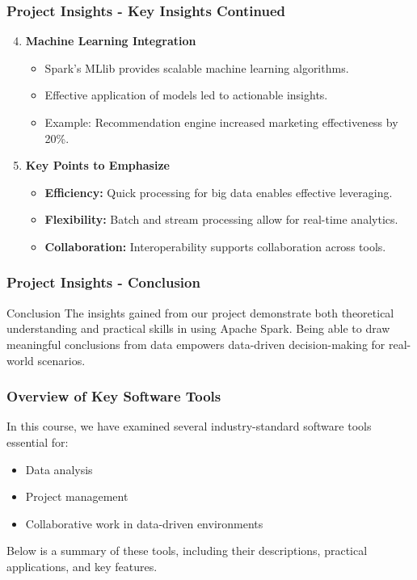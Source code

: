 \documentclass[aspectratio=169]{beamer}
\begin{document}
\begin{frame}[fragile]
    \frametitle{Project Insights - Key Insights Continued}
    \begin{enumerate}
        \setcounter{enumi}{3} %
        \item \textbf{Machine Learning Integration}
        \begin{itemize}
            \item Spark's MLlib provides scalable machine learning algorithms.
            \item Effective application of models led to actionable insights.
            \item Example: Recommendation engine increased marketing effectiveness by 20\%.
        \end{itemize}
        
        \item \textbf{Key Points to Emphasize}
        \begin{itemize}
            \item \textbf{Efficiency:} Quick processing for big data enables effective leveraging.
            \item \textbf{Flexibility:} Batch and stream processing allow for real-time analytics.
            \item \textbf{Collaboration:} Interoperability supports collaboration across tools.
        \end{itemize}
    \end{enumerate}
\end{frame}

\begin{frame}[fragile]
    \frametitle{Project Insights - Conclusion}
    \begin{block}{Conclusion}
        The insights gained from our project demonstrate both theoretical understanding and practical skills in using Apache Spark. 
        Being able to draw meaningful conclusions from data empowers data-driven decision-making for real-world scenarios.
    \end{block}
\end{frame}

\begin{frame}[fragile]
    \frametitle{Overview of Key Software Tools}
    In this course, we have examined several industry-standard software tools essential for:
    \begin{itemize}
        \item Data analysis
        \item Project management
        \item Collaborative work in data-driven environments
    \end{itemize}
    Below is a summary of these tools, including their descriptions, practical applications, and key features.
\end{frame}
\end{document}
